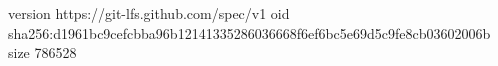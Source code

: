 version https://git-lfs.github.com/spec/v1
oid sha256:d1961bc9cefcbba96b12141335286036668f6ef6bc5e69d5c9fe8cb03602006b
size 786528
